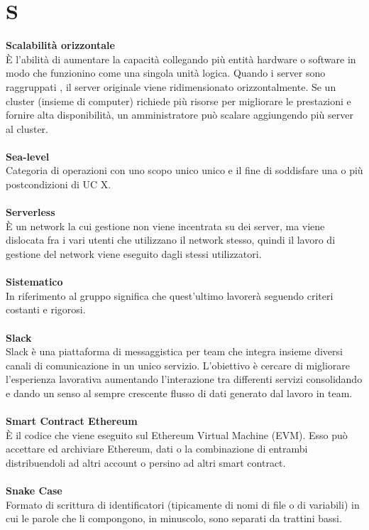 \section{S}

\textbf{Scalabilità orizzontale}\\
È l'abilità di aumentare la capacità collegando più entità hardware o software in modo che funzionino come una singola unità logica. Quando i server sono raggruppati , il server originale viene ridimensionato orizzontalmente. Se un cluster (insieme di computer) richiede più risorse per migliorare le prestazioni e fornire alta disponibilità, un amministratore può scalare aggiungendo più server al cluster. \\ \\
\textbf{Sea-level}\\
Categoria di operazioni con uno scopo unico unico e il fine di soddisfare una o più postcondizioni di UC X. \\ \\
\textbf{Serverless}\\
È un network la cui gestione non viene incentrata su dei server, ma viene dislocata fra i vari utenti che utilizzano il network stesso, quindi il lavoro di gestione del network viene eseguito dagli stessi utilizzatori. \\ \\
\textbf{Sistematico}\\
In riferimento al gruppo \Gruppo{} significa che quest'ultimo lavorerà seguendo criteri costanti e rigorosi. \\ \\
\textbf{Slack}\\
Slack è una piattaforma di messaggistica per team che integra insieme diversi canali di comunicazione in un unico servizio. L’obiettivo è cercare di migliorare l’esperienza lavorativa aumentando l’interazione tra differenti servizi consolidando e dando un senso al sempre crescente flusso di dati generato dal lavoro in team. \\ \\
\textbf{Smart Contract Ethereum}\\
È il codice che viene eseguito sul Ethereum Virtual Machine (EVM). Esso può accettare ed archiviare Ethereum, dati o la combinazione di entrambi distribuendoli ad altri account o persino ad altri smart contract. \\ \\
\textbf{Snake Case}\\
Formato di scrittura di identificatori (tipicamente di nomi di file o di variabili) in cui le parole che li compongono, in minuscolo, sono separati da trattini bassi.
